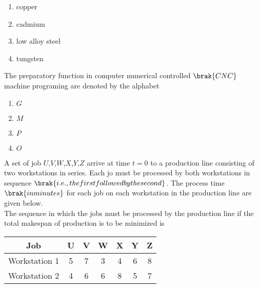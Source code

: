  \begin{enumerate}
   \item copper\\
   \item cadmium\\
   \item low alloy steel\\
   \item tungsten
 \end{enumerate}
 \item The preparatory function in computer numerical controlled $\brak{CNC}$ machine programing are denoted by the alphabet\\
 \begin{enumerate}
     \item $G$\\
     \item $M$\\
     \item $P$\\
     \item $O$
 \end{enumerate}
 \item A set of job $U$,$V$,$W$,$X$,$Y$,$Z$ arrive at time $t=0$ to a production line consisting of two workstations in series. Each jo must be processed by both workstations in sequence $\brak{i.e., the first followed by the second}$. The process time $\brak{in minutes}$ for each job on each workstation in the production line are given below.\\

 The sequence in which the jobs must be processed by the production line if the total makespan of production is to be minimized is\\
\begin{table}[h!]
\centering
\begin{tabular}{|c|c|c|c|c|c|c|}
\hline
\textbf{Job} & \textbf{U} & \textbf{V} & \textbf{W} & \textbf{X} & \textbf{Y} & \textbf{Z} \\ \hline
Workstation 1 & 5 & 7 & 3 & 4 & 6 & 8 \\ \hline
Workstation 2 & 4 & 6 & 6 & 8 & 5 & 7 \\ \hline
\end{tabular}
\end{table}
 

